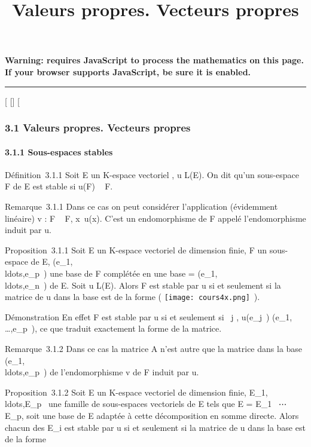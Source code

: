 \documentclass[]{article}
\title{Valeurs propres. Vecteurs propres}
\author{}
\date{}
\begin{document}
\maketitle

\textbf{Warning: 
requires JavaScript to process the mathematics on this page.\\ If your
browser supports JavaScript, be sure it is enabled.}

\begin{center}\rule{3in}{0.4pt}\end{center}

[
[]
[

\subsubsection{3.1 Valeurs propres. Vecteurs propres}

\paragraph{3.1.1 Sous-espaces stables}

Définition~3.1.1 Soit E un K-espace vectoriel , u \in L(E). On dit qu'un
sous-espace F de E est stable si u(F) \subset~ F.

Remarque~3.1.1 Dans ce cas on peut considérer l'application (évidemment
linéaire) v : F \rightarrow~ F, x\mapsto~u(x). C'est un
endomorphisme de F appelé l'endomorphisme induit par u.

Proposition~3.1.1 Soit E un K-espace vectoriel de dimension finie, F un
sous-espace de E,
(e_1,\\ldots,e_p~)
une base de F complétée en une base  =
(e_1,\\ldots,e_n~)
de E. Soit u \in L(E). Alors F est stable par u si et seulement si la
matrice de u dans la base  est de la forme \left (
\texttt{[image: cours4x.png]} \,\right ).

Démonstration En effet F est stable par u si et seulement si
\forall~j \in [1,p], u(e_j~)
\in\mathrmVect(e_1,\\\ldots,e_p~),
ce que traduit exactement la forme de la matrice.

Remarque~3.1.2 Dans ce cas la matrice A n'est autre que la matrice dans
la base
(e_1,\\ldots,e_p~)
de l'endomorphisme v de F induit par u.

Proposition~3.1.2 Soit E un K-espace vectoriel de dimension finie,
E_1,\\ldots,E_p~
une famille de sous-espaces vectoriels de E tels que E = E_1
\oplus~⋯ \oplus~ E_p, soit  une base de E
adaptée à cette décomposition en somme directe. Alors chacun des
E_i est stable par u si et seulement si la matrice de u dans la
base  est de la forme
\end{document}
